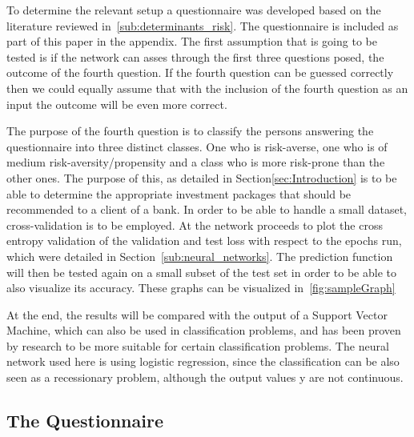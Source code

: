 \documentclass[12pt]{article}
\begin{document}
To determine the relevant setup a questionnaire was developed based on the literature reviewed in~\ref{sub:determinants_risk}. The questionnaire is included as part of this paper in the appendix. The first assumption that is going to be tested is if the network can asses through the first three questions posed, the outcome of the fourth question. If the fourth question can be guessed correctly then we could equally assume that with the inclusion of the fourth question as an input the outcome will be even more correct. 

The purpose of the fourth question is to classify the persons answering the questionnaire into three distinct classes. One who is risk-averse, one who is of medium risk-aversity/propensity and a class who is more risk-prone than the other ones. The purpose of this, as detailed in Section\ref{sec:Introduction} is to be able to determine the appropriate investment packages that should be recommended to a client of a bank.
In order to be able to handle a small dataset, cross-validation is to be employed. At the network proceeds to plot the cross entropy validation of the validation and test loss with respect to the epochs run, which were detailed in Section~\ref{sub:neural_networks}. The prediction function will then be tested again on a small subset of the test set in order to be able to also visualize its accuracy. These graphs can be visualized in~\ref{fig:sampleGraph}

At the end, the results will be compared with the output of a Support Vector Machine, which can also be used in classification problems, and has been proven by research to be more suitable for certain classification problems. The neural network used here is using logistic regression, since the classification can be also seen as a recessionary problem, although the output values y are not continuous.
\subsection{The Questionnaire}
\end{document}
